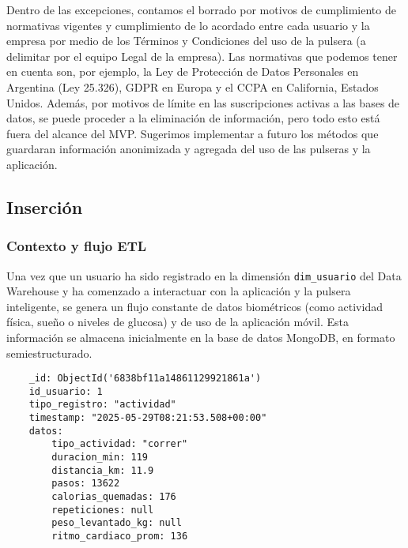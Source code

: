Dentro de las excepciones, contamos el borrado por motivos de cumplimiento de normativas vigentes y cumplimiento de lo acordado entre cada usuario y la empresa por medio de los Términos y Condiciones del uso de la pulsera (a delimitar por el equipo Legal de la empresa). Las normativas que podemos tener en cuenta son, por ejemplo, la Ley de Protección de Datos Personales en Argentina (Ley 25.326), GDPR en Europa y el CCPA en California, Estados Unidos. Además, por motivos de límite en las suscripciones activas a las bases de datos, se puede proceder a la eliminación de información, pero todo esto está fuera del alcance del MVP. Sugerimos implementar a futuro los métodos que guardaran información anonimizada y agregada del uso de las pulseras y la aplicación.
\subsection{Inserción}
\subsubsection{Contexto y flujo ETL}
Una vez que un usuario ha sido registrado en la dimensión \texttt{dim\_usuario} del Data Warehouse y ha comenzado a interactuar con la aplicación y la pulsera inteligente, se genera un flujo constante de datos biométricos (como actividad física, sueño o niveles de glucosa) y de uso de la aplicación móvil. Esta información se almacena inicialmente en la base de datos MongoDB, en formato semiestructurado.

\begin{lstlisting}
    _id: ObjectId('6838bf11a14861129921861a')
    id_usuario: 1
    tipo_registro: "actividad"
    timestamp: "2025-05-29T08:21:53.508+00:00"
    datos:
        tipo_actividad: "correr"
        duracion_min: 119
        distancia_km: 11.9
        pasos: 13622
        calorias_quemadas: 176
        repeticiones: null
        peso_levantado_kg: null
        ritmo_cardiaco_prom: 136

\end{lstlisting}

